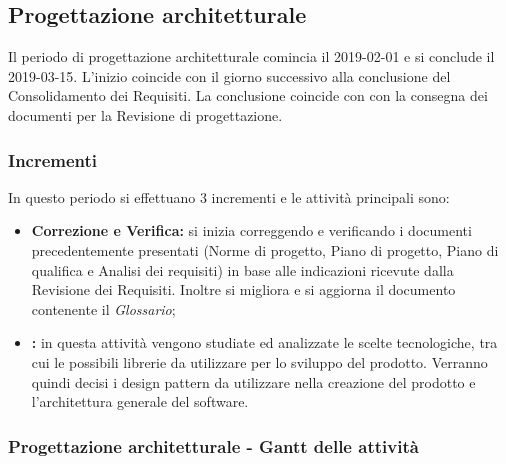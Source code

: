 \subsection{Progettazione architetturale}
Il periodo di progettazione architetturale comincia il 2019-02-01 e si conclude il 2019-03-15. L'inizio coincide con il giorno successivo alla conclusione del Consolidamento dei Requisiti. La conclusione coincide con con la consegna dei documenti per la Revisione di progettazione. \\
\subsubsection{Incrementi}
In questo periodo si effettuano 3 incrementi e le attività principali sono:
\begin{itemize}
	\item \textbf{Correzione e Verifica:} si inizia correggendo e verificando i documenti precedentemente presentati (Norme di progetto, Piano di progetto, Piano di qualifica e Analisi dei requisiti) in base alle indicazioni ricevute dalla Revisione dei Requisiti. Inoltre si migliora e si aggiorna il documento contenente il \textit{Glossario};
	\item \textbf{:} in questa attività vengono studiate ed analizzate le scelte tecnologiche, tra cui le possibili librerie da utilizzare per lo sviluppo del prodotto. Verranno quindi decisi i design pattern da utilizzare nella creazione del prodotto e l'architettura generale del software.
\end{itemize}

\subsubsection{Progettazione architetturale - Gantt delle attività}

\pagebreak